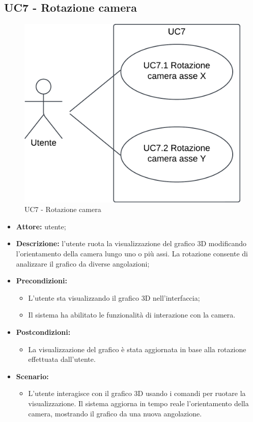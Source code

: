 \subsection{UC7 - Rotazione camera}
\begin{figure}[h!]
    \centering
    \includegraphics[scale=0.7]{template/images/UC7_7.1_7.2.png}
    \caption{UC7 - Rotazione camera}
\end{figure}
\begin{itemize}
    \item \textbf{Attore:} utente;
    \item \textbf{Descrizione:} l'utente ruota la visualizzazione del grafico 3D modificando l'orientamento della camera lungo uno o più assi. La rotazione consente di analizzare il grafico da diverse angolazioni;
    \item \textbf{Precondizioni:} 
    \begin{itemize}
        \item L'utente sta visualizzando il grafico 3D nell'interfaccia;
        \item Il sistema ha abilitato le funzionalità di interazione con la camera.
    \end{itemize}
    \item \textbf{Postcondizioni:} 
    \begin{itemize}
        \item La visualizzazione del grafico è stata aggiornata in base alla rotazione effettuata dall'utente.
    \end{itemize}
    \item \textbf{Scenario:} 
    \begin{itemize}
        \item L'utente interagisce con il grafico 3D usando i comandi per ruotare la visualizzazione. Il sistema aggiorna in tempo reale l'orientamento della camera, mostrando il grafico da una nuova angolazione.
    \end{itemize}
    
\end{itemize}
